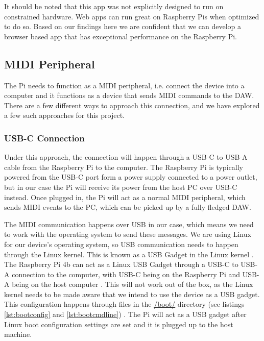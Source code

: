 It should be noted that this app was not explicitly designed to run on constrained
hardware. Web apps can run great on Raspberry Pis when optimized to do so. Based on our
findings here we are confident that we can develop a browser based app that has
exceptional performance on the Raspberry Pi.

\subsection{MIDI Peripheral}
\label{sec:midi_peripheral}

The Pi needs to function as a MIDI peripheral, i.e. connect the device into a computer and
it functions as a device that sends MIDI commands to the DAW. There are a few different
ways to approach this connection, and we have explored a few such approaches for this
project.


\subsubsection{USB-C Connection}

Under this approach, the connection will happen through a USB-C to USB-A cable from the
Raspberry Pi to the computer. The Raspberry Pi is typically powered from the USB-C port
form a power supply connected to a power outlet, but in our case the Pi will receive its
power from the host PC over USB-C instead. Once plugged in, the Pi will act as a normal
MIDI peripheral, which sends MIDI events to the PC, which can be picked up by a fully
fledged DAW.

The MIDI communication happens over USB in our case, which means we need to work with the
operating system to send these messages. We are using Linux for our device's operating
system, so USB communication needs to happen through the Linux kernel. This is known as a
USB Gadget in the Linux kernel \autocite{usbGadgetDocumentation}. The Raspberry Pi 4b can
act as a Linux USB Gadget through a USB-C to USB-A connection to the computer, with USB-C
being on the Raspberry Pi and USB-A being on the host computer
\autocite{raspberryPiGadgetSetup}. This will not work out of the box, as the Linux kernel
needs to be made aware that we intend to use the device as a USB gadget. This
configuration happens through files in the \url{/boot/} directory
(see listings \ref{lst:bootconfig} and
\ref{lst:bootcmdline}) \autocite{raspberryPiGadgetSetup}. The Pi will act as a USB
gadget after Linux boot configuration settings are set and it is plugged up to the host
machine.

